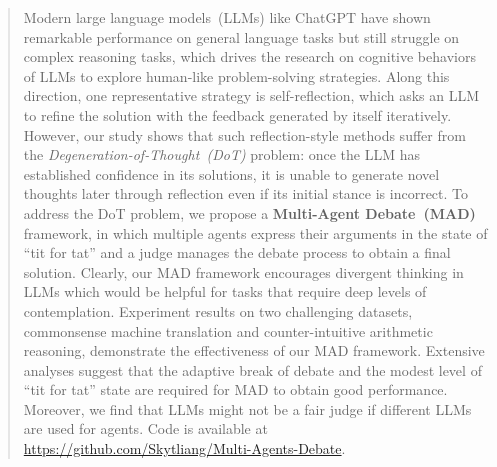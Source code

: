 \begin{abstract}
Modern large language models~(LLMs) like ChatGPT have shown remarkable performance on general language tasks but still struggle on complex reasoning tasks, which drives the research on cognitive behaviors of LLMs to explore human-like problem-solving strategies. 
Along this direction, one representative strategy is self-reflection, which asks an LLM to refine the solution with the feedback generated by itself iteratively. 
However, our study shows that such reflection-style methods suffer from the \textit{Degeneration-of-Thought~(DoT)} problem: once the LLM has established confidence in its solutions, it is unable to generate novel thoughts later through reflection even if its initial stance is incorrect.
To address the DoT problem, we propose a \textbf{Multi-Agent Debate~(MAD)} framework, in which multiple agents express their arguments in the state of ``tit for tat'' and a judge manages the debate process to obtain a final solution. 
Clearly, our MAD framework encourages divergent thinking in LLMs which would be helpful for tasks that require deep levels of contemplation.
Experiment results on two challenging datasets, commonsense machine translation and counter-intuitive arithmetic reasoning, demonstrate the effectiveness of our MAD framework. 
Extensive analyses suggest that the adaptive break of debate and the modest level of ``tit for tat'' state are required for MAD to obtain good performance. Moreover, we find that LLMs might not be a fair judge if different LLMs are used for agents. 
Code is available at \url{https://github.com/Skytliang/Multi-Agents-Debate}.

\end{abstract}